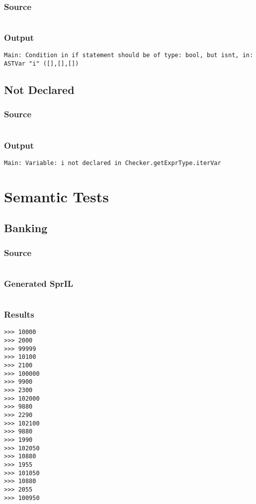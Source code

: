 \documentclass[twoside]{report}
\begin{document}
\subsection{Source}
\inputminted[tabsize=4,linenos,firstnumber=1]{text}{../test/wrong_type.shl}
\subsection{Output}
\begin{verbatim}
Main: Condition in if statement should be of type: bool, but isnt, in: ASTVar "i" ([],[],[])
\end{verbatim}

\section{Not Declared}
\subsection{Source}
\inputminted[tabsize=4,linenos,firstnumber=1]{text}{../test/not_declared.shl}
\subsection{Output}
\begin{verbatim}
Main: Variable: i not declared in Checker.getExprType.iterVar
\end{verbatim}


\chapter{Semantic Tests}

\section{Banking}
\subsection{Source}
\inputminted[tabsize=4,linenos,firstnumber=1]{text}{../test/banking.shl}
\subsection{Generated SprIL}
\inputminted[tabsize=4,linenos,firstnumber=0]{text}{../test/banking_gen.txt}
\subsection{Results}
\begin{verbatim}
>>> 10000
>>> 2000
>>> 99999
>>> 10100
>>> 2100
>>> 100000
>>> 9900
>>> 2300
>>> 102000
>>> 9880
>>> 2290
>>> 102100
>>> 9880
>>> 1990
>>> 102050
>>> 10880
>>> 1955
>>> 101050
>>> 10880
>>> 2055
>>> 100950
\end{verbatim}
\end{document}
